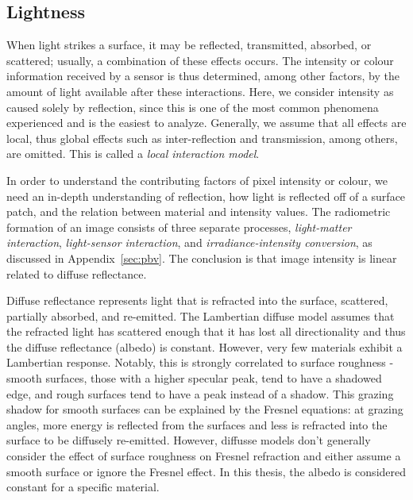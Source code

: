 \subsection{Lightness}
When light strikes a surface, it may be reflected, transmitted, absorbed, or scattered; usually, a combination of these effects occurs. The intensity or colour information received by a sensor is thus determined, among other factors, by the amount of light available after these interactions. Here, we consider intensity as caused solely by reflection, since this is one of the most common phenomena experienced and is the easiest to analyze. Generally, we assume that all effects are local, thus global effects such as inter-reflection and transmission, among others, are omitted. This is called a \textit{local interaction model}.

In order to understand the contributing factors of pixel intensity or colour, we need an in-depth understanding of reflection, \ie how light is reflected off of a surface patch, and the relation between material and intensity values. The radiometric formation of an image consists of three separate processes, \textit{light-matter interaction}, \textit{light-sensor interaction}, and \textit{irradiance-intensity conversion}, as discussed in Appendix~\ref{sec:pbv}. The conclusion is that image intensity is linear related to diffuse reflectance.

Diffuse reflectance represents light that is refracted into the surface, scattered, partially absorbed, and re-emitted. The Lambertian diffuse model assumes that the refracted light has scattered enough that it has lost all directionality and thus the diffuse reflectance (albedo) is constant. However, very few materials exhibit a Lambertian response. Notably, this is strongly correlated to surface roughness - smooth surfaces, \ie those with a higher specular peak, tend to have a shadowed edge, and rough surfaces tend to have a peak instead of a shadow. This grazing shadow for smooth surfaces can be explained by the Fresnel equations: at grazing angles, more energy is reflected from the surfaces and less is refracted into the surface to be diffusely re-emitted. However, diffusse models don't generally consider the effect of surface roughness on Fresnel refraction and either assume a smooth surface or ignore the Fresnel effect. In this thesis, the albedo is considered constant for a specific material.

